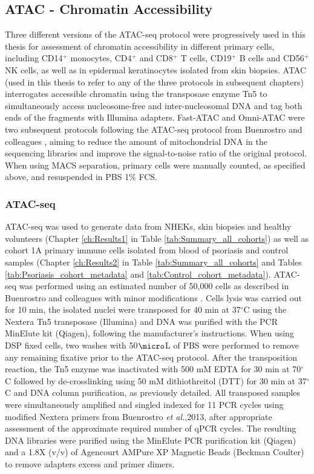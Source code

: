 \subsection{ATAC - Chromatin Accessibility}
Three different versions of the ATAC-seq protocol were progressively used in this thesis for assessment of chromatin accessibility in different primary cells, including CD14$^{+}$ monocytes, CD4$^+$ and CD8$^+$ T cells, CD19$^+$ B cells and CD56$^+$ NK cells, as well as in epidermal keratinocytes isolated from skin biopsies. ATAC (used in this thesis to refer to any of the three protocols in subsequent chapters) interrogates accessible chromatin using the transposase enzyme Tn5 to simultaneously access nucleosome-free and inter-nucleosomal DNA and tag both ends of the fragments with Illumina adapters. Fast-ATAC and Omni-ATAC were two subsequent protocols following the ATAC-seq protocol from Buenrostro and colleagues \parencite{Buenrostro2013}, aiming to reduce the amount of mitochondrial DNA in the sequencing libraries and improve the signal-to-noise ratio of the original protocol. When using MACS separation, primary cells were manually counted, as specified above, and resuspended in PBS 1\% FCS.

\subsubsection{ATAC-seq}

ATAC-seq was used to generate data from NHEKs, skin biopsies and healthy volunteers (Chapter \ref{ch:Results1} in Table \ref{tab:Summary_all_cohorts}) as well as cohort 1A primary immune cells isolated from blood of psoriasis and control samples (Chapter \ref{ch:Results2} in Table \ref{tab:Summary_all_cohorts} and Tables \ref{tab:Psoriasis_cohort_metadata} and \ref{tab:Control_cohort_metadata}). ATAC-seq was performed using an estimated number of 50,000 cells as described in Buenrostro and colleagues with minor modifications \parencite{Buenrostro2013}. Cells lysis was carried out for 10 min, the isolated nuclei were transposed for 40 min at 37{$^\circ$}C using the Nextera Tn5 transposase (Illumina) and DNA was purified with the PCR MinElute kit (Qiagen), following the manufacturer's instructions. When using DSP fixed cells, two washes with 50$\micro$L of PBS were performed to remove any remaining fixative prior to the ATAC-seq protocol. After the transposition reaction, the Tn5 enzyme was inactivated with 500 mM EDTA for 30 min at 70{$^\circ$}C followed by de-crosslinking using 50 mM dithiothreitol (DTT) for 30 min at 37{$^\circ$}C and DNA column purification, as previously detailed.  All transposed samples were simultaneously amplified and singled indexed for 11 PCR cycles using modified Nextera primers from Buenrostro \textit{et al.},2013, after appropriate assessment of the approximate required number of qPCR cycles. The resulting DNA libraries were purified using the MinElute PCR purification kit (Qiagen) and a 1.8X (v/v) of Agencourt AMPure XP Magnetic Beads (Beckman Coulter) to remove adapters excess and primer dimers.


